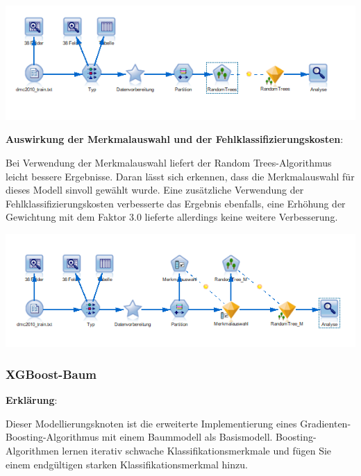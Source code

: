 \documentclass[a4paper,12pt]{article}
\newcounter{Algorithmus}
\begin{document}
\begin{center}
\includegraphics[width=\textwidth]{Screens/random_trees}
\end{center}

{\bf Auswirkung der Merkmalauswahl und der Fehlklassifizierungskosten}:
\par
Bei Verwendung der Merkmalauswahl liefert der Random Trees-Algorithmus leicht bessere Ergebnisse.
Daran lässt sich erkennen, dass die Merkmalauswahl für dieses Modell sinvoll gewählt wurde.
Eine zusätzliche Verwendung der Fehlklassifizierungskosten verbesserte das Ergebnis ebenfalls, eine Erhöhung der Gewichtung mit dem Faktor 3.0 lieferte allerdings keine weitere Verbesserung.

\begin{center}
\includegraphics[width=\textwidth]{Screens/random_trees_m}
\end{center}

\subsubsection{XGBoost-Baum}
{\bf Erklärung}:
\par
\vspace{0.2cm}
Dieser Modellierungsknoten ist die erweiterte Implementierung eines Gradienten-Boosting-Algorithmus mit einem
Baummodell als Basismodell. Boosting-Algorithmen lernen iterativ schwache Klassifikationsmerkmale
und fügen Sie einem endgültigen starken Klassifikationsmerkmal hinzu.
\end{document}
